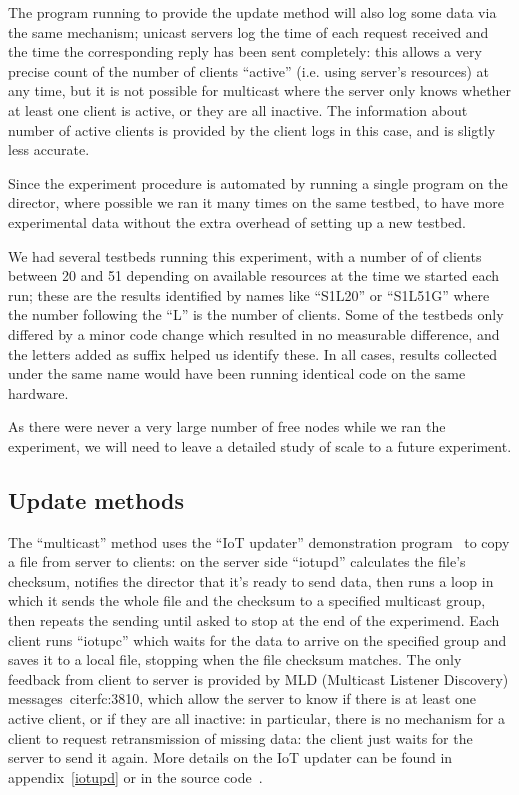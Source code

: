 \documentclass[a4paper,11pt,twocolumn]{article}
\begin{document}
The program running to provide the update method will also log some
data via the same mechanism; unicast servers log the time of each
request received and the time the corresponding reply has been
sent completely: this allows a very precise count of the number of
clients ``active'' (i.e. using server's resources) at any time, but
it is not possible for multicast where the server only knows whether
at least one client is active, or they are all inactive. The information
about number of active clients is provided by the client logs in this
case, and is sligtly less accurate.

Since the experiment procedure is automated by running a single program
on the director, where possible we ran it many times on the same
testbed, to have more experimental data without the extra overhead
of setting up a new testbed.

We had several testbeds running this experiment, with a number of
of clients between 20 and 51 depending on available resources at
the time we started each run; these are the results identified
by names like ``S1L20'' or ``S1L51G'' where the number following
the ``L'' is the number of clients. Some of the testbeds only differed
by a minor code change which resulted in no measurable difference,
and the letters added as suffix helped us identify these.  In all
cases, results collected under the same name would have been running
identical code on the same hardware.

As there were never a very large number of free nodes while we ran
the experiment, we will need to leave a detailed study of scale to
a future experiment.

\subsection{Update methods}
The ``multicast'' method uses the ``IoT updater'' demonstration
program~\cite{iotupd:presentation} to copy a file from server to clients: on
the server side ``iotupd'' calculates the file's checksum, notifies the
director that it's ready to send data, then runs a loop in which it sends
the whole file and the checksum to a specified multicast group, then
repeats the sending until asked to stop at the end of the experimend.
Each client runs ``iotupc'' which waits for the data to arrive on the
specified group and saves it to a local file, stopping when the file
checksum matches.  The only feedback from client to server is provided by
MLD (Multicast Listener Discovery) messages~cite{rfc:3810}, which allow
the server to know if there is at least one active client, or if they
are all inactive: in particular, there is no mechanism for a client to
request retransmission of missing data: the client just waits for the
server to send it again. More details on the IoT updater can be found
in appendix~\ref{iotupd} or in the source code~\cite{iotupd:sources}.
\end{document}

